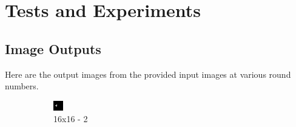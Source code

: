 \documentclass[]{article}
\begin{document}
\clearpage

\section {Tests and Experiments}

\subsection{Image Outputs}
Here are the output images from the provided input images at various round numbers.

\begin{figure}[!htb]
\begin{subfigure}{0.16\textwidth}
	\centering
	\includegraphics[width=\linewidth]{images/16x16_2_Rounds.png}
	\caption{16x16 - 2}
\end{subfigure}
\begin{subfigure}{0.16\textwidth}

\end{subfigure}
\end{figure}
\end{document}
